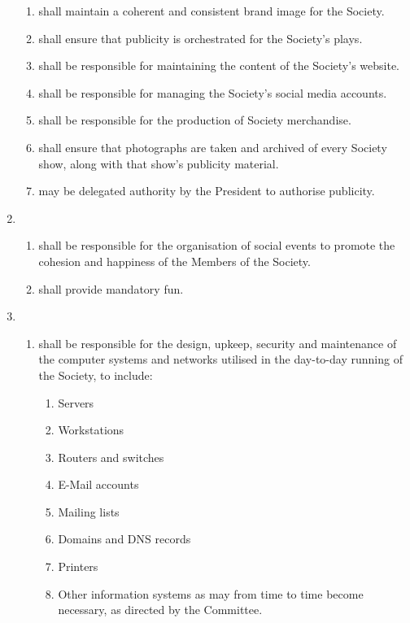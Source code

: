 \documentclass[a4paper]{tufte-handout}
\newcommand{\policyOffset}{12pt}
\newcommand{\policyPub}[2][\policyOffset]{\marginnote[#1]{\textsc{Publicity Policy \S#2}}}
\begin{document}
\begin{enumerate}[resume]
\begin{enumerate}
            \item shall maintain a coherent and consistent brand image for the Society.
            \item shall ensure that publicity is orchestrated for the Society's plays.
            \item shall be responsible for maintaining the content of the Society's website.
            \item shall be responsible for managing the Society's social media accounts.
            \item shall be responsible for the production of Society merchandise.
            \item shall ensure that photographs are taken and archived of every Society show, along with that show's publicity material.
            \item \policyPub{4} may be delegated authority by the President to authorise publicity.
        \end{enumerate}
    \item {}
        \begin{enumerate}
            \item shall be responsible for the organisation of social events to promote the cohesion and happiness of the Members of the Society.
            \item shall provide mandatory fun.
        \end{enumerate}
    \item {}
        \begin{enumerate}
            \item shall be responsible for the design, upkeep, security and maintenance of the computer systems and networks utilised in the day-to-day running of the Society, to include:
                \begin{enumerate}
                    \item Servers
                    \item Workstations
                    \item Routers and switches
                    \item E-Mail accounts
                    \item Mailing lists
                    \item Domains and DNS records
                    \item Printers
                    \item Other information systems as may from time to time become necessary, as directed by the Committee.

\end{enumerate}
\end{enumerate}
\end{enumerate}
\end{document}
